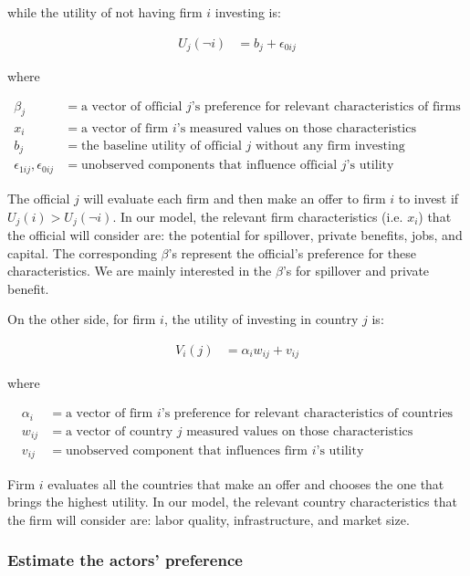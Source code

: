 while the utility of not having firm $i$ investing is:

\begin{align}
U_j(\neg i) &= b_j + \epsilon_{0ij}
\end{align}

where

\begin{align*}
\beta_j &= \text{a vector of official $j$'s preference for relevant characteristics of firms} \\
x_i &= \text{a vector of firm $i$'s measured values on those characteristics} \\
b_j &= \text{the baseline utility of official $j$ without any firm investing} \\
\epsilon_{1ij}, \epsilon_{0ij} &= \text{unobserved components that influence official $j$'s utility}
\end{align*}

The official $j$ will evaluate each firm and then make an offer to firm $i$ to invest if $U_j(i) > U_j(\neg i)$. In our model, the relevant firm characteristics (i.e. $x_i$) that the official will consider are: the potential for spillover, private benefits, jobs, and capital. The corresponding $\beta$'s represent the official's preference for these characteristics. We are mainly interested in the $\beta$'s for spillover and private benefit.

On the other side, for firm $i$, the utility of investing in country $j$ is:

\begin{align}
V_i(j) &= \alpha_i w_{ij} + v_{ij}
\end{align}

where

\begin{align*}
\alpha_i &= \text{a vector of firm $i$'s preference for relevant characteristics of countries} \\
w_{ij} &= \text{a vector of country $j$ measured values on those characteristics} \\
v_{ij} &= \text{unobserved component that influences firm $i$'s utility}
\end{align*}

Firm $i$ evaluates all the countries that make an offer and chooses the one that brings the highest utility. In our model, the relevant country characteristics that the firm will consider are: labor quality, infrastructure, and market size.

\subsubsection{Estimate the actors' preference}
\label{sec:tsl_estimate}

